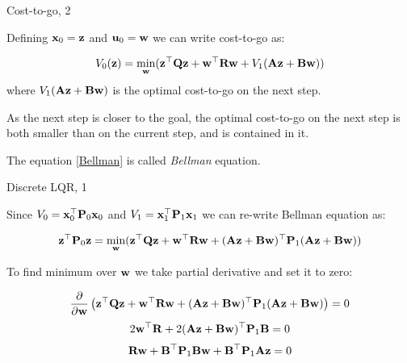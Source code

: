 \documentclass{beamer}
\begin{document}
\begin{frame}{Cost-to-go, 2}
	\begin{flushleft}
		
		
		Defining $\mathbf{x}_0 = \mathbf{z}$ and $\mathbf{u}_0 = \mathbf{w}$ we can write cost-to-go as:
		
		\begin{equation}
			\label{Bellman}
			V_0(\mathbf{z}) = \underset{\mathbf{w}}{\text{min}} 
			(\mathbf{z}^\top \mathbf{Q} \mathbf{z} +  \mathbf{w}^\top \mathbf{R} \mathbf{w}  + V_1(\mathbf{A}\mathbf{z} + \mathbf{B}\mathbf{w})  )
		\end{equation}
		where $V_1(\mathbf{A}\mathbf{z} + \mathbf{B}\mathbf{w})$ is the optimal cost-to-go on the next step. 
		
		\bigskip
		
		As the next step is closer to the goal, the optimal cost-to-go on the next step is both smaller than on the current step, and is contained in it.
		
		\bigskip
		
		The equation \eqref{Bellman} is called \emph{Bellman} equation.
		
	\end{flushleft}
\end{frame}



\begin{frame}{Discrete LQR, 1}
	\begin{flushleft}
		
		Since $V_0 = \mathbf{x}_0^\top \mathbf{P}_0 \mathbf{x}_0$ and $V_1 = \mathbf{x}_1^\top \mathbf{P}_1 \mathbf{x}_1$ we can re-write Bellman equation as:
		
		\begin{equation}
			\mathbf{z}^\top \mathbf{P}_0 \mathbf{z}
			 = \underset{\mathbf{w}}{\text{min}} 
			(\mathbf{z}^\top \mathbf{Q} \mathbf{z} +  \mathbf{w}^\top \mathbf{R} \mathbf{w}  + 
			(\mathbf{A}\mathbf{z} + \mathbf{B}\mathbf{w})^\top \mathbf{P}_1 (\mathbf{A}\mathbf{z} + \mathbf{B}\mathbf{w}) 
			 )
		\end{equation}
		
		To find minimum over $\mathbf{w}$ we take partial derivative and set it to zero:
		
		\begin{align}
			\frac{\partial}{\partial \mathbf{w}}
			\left( 
			\mathbf{z}^\top \mathbf{Q} \mathbf{z} +  \mathbf{w}^\top \mathbf{R} \mathbf{w}  + 
			(\mathbf{A}\mathbf{z} + \mathbf{B}\mathbf{w})^\top \mathbf{P}_1 (\mathbf{A}\mathbf{z} + \mathbf{B}\mathbf{w}) 
			\right) = 0
		\end{align}
		\begin{align}
		2\mathbf{w}^\top \mathbf{R}  + 
		2(\mathbf{A}\mathbf{z} + \mathbf{B}\mathbf{w})^\top \mathbf{P}_1 \mathbf{B} = 0
		\end{align}
		\begin{align}
			\mathbf{R}\mathbf{w} + \mathbf{B}^\top \mathbf{P}_1 \mathbf{B} \mathbf{w} + \mathbf{B}^\top \mathbf{P}_1 \mathbf{A}\mathbf{z} = 0
		\end{align}
		
	\end{flushleft}
\end{frame}
\end{document}
